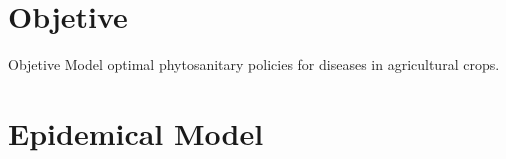 \documentclass[10pt]{beamer}
\begin{document}
\section{Objetive}
\begin{frame}{}{}
	\begin{block}{Objetive}
		Model optimal phytosanitary policies for diseases in agricultural crops.
	\end{block}
	
\end{frame}

\section{Epidemical Model}

\begin{frame}{}
\begin{bibunit}[abbrv]
	\nocite{Holt1999b}
	\putbib
\end{bibunit}
\end{frame}
\end{document}
